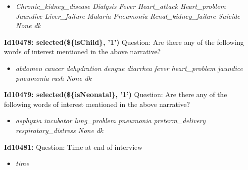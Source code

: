 \documentclass{article}%
\begin{document}
%
\begin{itemize}%
\item%
\textit{Chronic\_kidney\_disease\newline%
 Dialysis\newline%
 Fever\newline%
 Heart\_attack\newline%
 Heart\_problem\newline%
 Jaundice\newline%
 Liver\_failure\newline%
 Malaria\newline%
 Pneumonia\newline%
 Renal\_kidney\_failure\newline%
 Suicide\newline%
 None\newline%
 dk\newline%
}%
\end{itemize}%
\textbf{Id10478: selected(\$\{isChild\}, '1')\newline%
}%
Question: Are there any of the following words of interest mentioned in the above narrative?\newline%
%
\begin{itemize}%
\item%
\textit{abdomen\newline%
 cancer\newline%
 dehydration\newline%
 dengue\newline%
 diarrhea\newline%
 fever\newline%
 heart\_problem\newline%
 jaundice\newline%
 pneumonia\newline%
 rash\newline%
 None\newline%
 dk\newline%
}%
\end{itemize}%
\textbf{Id10479: selected(\$\{isNeonatal\}, '1')\newline%
}%
Question: Are there any of the following words of interest mentioned in the above narrative?\newline%
%
\begin{itemize}%
\item%
\textit{asphyxia\newline%
 incubator\newline%
 lung\_problem\newline%
 pneumonia\newline%
 preterm\_delivery\newline%
 respiratory\_distress\newline%
 None\newline%
 dk\newline%
}%
\end{itemize}%
\textbf{Id10481: \newline%
}%
Question: Time at end of interview\newline%
%
\begin{itemize}%
\item%
\textit{time\newline%
}%
\end{itemize}%
\end{document}
